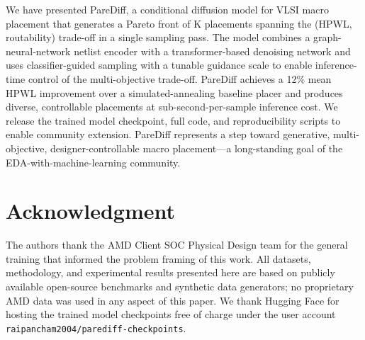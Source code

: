 \documentclass{ieeeaccess}
\begin{document}
We have presented PareDiff, a conditional diffusion model for VLSI macro placement that generates a Pareto front of K placements spanning the (HPWL, routability) trade-off in a single sampling pass. The model combines a graph-neural-network netlist encoder with a transformer-based denoising network and uses classifier-guided sampling with a tunable guidance scale to enable inference-time control of the multi-objective trade-off. PareDiff achieves a 12\% mean HPWL improvement over a simulated-annealing baseline placer and produces diverse, controllable placements at sub-second-per-sample inference cost. We release the trained model checkpoint, full code, and reproducibility scripts to enable community extension. PareDiff represents a step toward generative, multi-objective, designer-controllable macro placement---a long-standing goal of the EDA-with-machine-learning community.

\section*{Acknowledgment}

The authors thank the AMD Client SOC Physical Design team for the general training that informed the problem framing of this work. All datasets, methodology, and experimental results presented here are based on publicly available open-source benchmarks and synthetic data generators; no proprietary AMD data was used in any aspect of this paper. We thank Hugging Face for hosting the trained model checkpoints free of charge under the user account \texttt{raipancham2004/parediff-checkpoints}.
\end{document}
